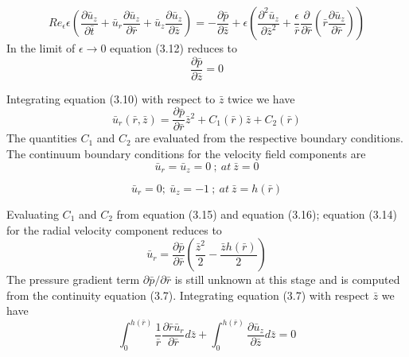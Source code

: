 \documentclass{jfm}
\begin{document}
\begin{equation}
    Re_{\epsilon}{\epsilon}\left(\frac{{\partial}\bar{u}_z}{{\partial}\bar{t}}+\bar{u}_r\frac{{\partial}\bar{u}_z}{{\partial}\bar{r}}+\bar{u}_z\frac{{\partial}\bar{u}_z}{{\partial}\bar{z}}\right)=-\frac{{\partial}\bar{p}}{{\partial}\bar{z}} + {\epsilon}\left(\frac{{\partial}^2\bar{u}_z}{{\partial}\bar{z}^2} + \frac{\epsilon}{\bar{r}}\frac{{\partial}}{{\partial}\bar{r}}\left(\bar{r}\frac{{\partial}\bar{u}_z}{{\partial}\bar{r}}\right)\right)
\end{equation}
In the limit of ${\epsilon}{\rightarrow}0$ equation (3.12) reduces to
\begin{equation}
     \frac{{\partial}\bar{p}}{{\partial}\bar{z}}=0
\end{equation}

Integrating equation (3.10) with respect to $\bar{z}$ twice we have
\begin{equation}
    {\bar{u}}_r(\bar{r},\bar{z}) = \frac{{\partial}\bar{p}}{{\partial}\bar{r}}\bar{{z}}^2 + C_1(\bar{r})\bar{z} + C_2(\bar{r})
\end{equation}
The quantities $C_1$ and $C_2$ are evaluated from the respective boundary conditions.
The continuum boundary conditions for the velocity field components are
\begin{equation}
    {\bar{u}}_r={\bar{u}}_z=0{\:};{\:}at{\:}\bar{z}=0
\end{equation}

\begin{equation}
    {\bar{u}}_r=0;{\:}{\bar{u}}_z=-1{\:};{\:}at{\:}\bar{z}=h(\bar{r})
\end{equation}

Evaluating $C_1$ and $C_2$ from equation (3.15) and equation (3.16); equation (3.14) for the radial velocity component reduces to
\begin{equation}
    {\bar{u}}_r = \frac{{\partial}\bar{p}}{{\partial}\bar{r}}\left(\frac{{\bar{z}}^2}{2} - \frac{\bar{z}h(\bar{r})}{2}\right)
\end{equation}
The pressure gradient term ${{\partial}\bar{p}}/{{\partial}\bar{r}}$ is still unknown at this stage and is computed from the continuity equation (3.7). Integrating equation (3.7) with respect $\bar{z}$ we have
\begin{equation}
    \int_0^{h(\bar{r})}\frac{1}{\bar{r}}\frac{{\partial}\bar{r}{\bar{u}}_r}{\partial{\bar{r}}}d\bar{z}+ \int_0^{h(\bar{r})}\frac{{\partial}{\bar{u}}_z}{{\partial}\bar{z}}d\bar{z}=0
\end{equation}
\end{document}
